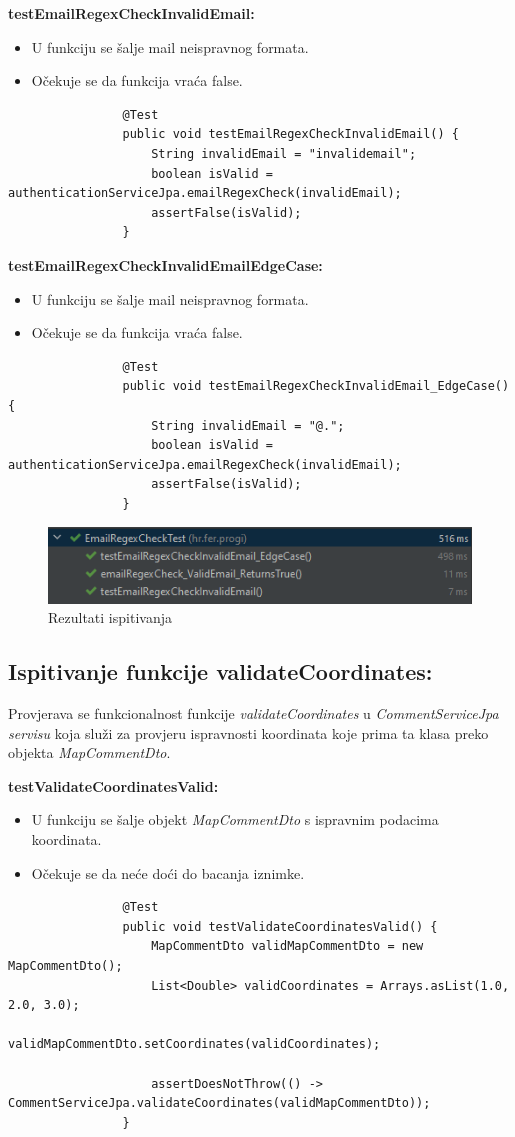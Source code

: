 			\textbf{testEmailRegexCheckInvalidEmail:}
			\begin{itemize}
				\item U funkciju se šalje mail neispravnog formata.
				\item Očekuje se da funkcija vraća false.
			\end{itemize}
			\begin{lstlisting}
				@Test
				public void testEmailRegexCheckInvalidEmail() {
					String invalidEmail = "invalidemail";
					boolean isValid = authenticationServiceJpa.emailRegexCheck(invalidEmail);
					assertFalse(isValid);
				}
			\end{lstlisting}
			
			\textbf{testEmailRegexCheckInvalidEmailEdgeCase:}
			\begin{itemize}
				\item U funkciju se šalje mail neispravnog formata.
				\item Očekuje se da funkcija vraća false.
			\end{itemize}
			\begin{lstlisting}
				@Test
				public void testEmailRegexCheckInvalidEmail_EdgeCase() {
					String invalidEmail = "@.";
					boolean isValid = authenticationServiceJpa.emailRegexCheck(invalidEmail);
					assertFalse(isValid);
				}
			\end{lstlisting}
			\begin{figure}[H]
				\includegraphics[scale=1]{slike/emailRegexTest.png} 
				\centering
				\caption{Rezultati ispitivanja}
				\label{fig:promjene}
			\end{figure}
			
			\subsection{Ispitivanje funkcije validateCoordinates:}
			Provjerava se funkcionalnost funkcije \textit{validateCoordinates} u \textit{CommentServiceJpa servisu} koja služi za provjeru ispravnosti koordinata koje prima ta klasa preko objekta \textit{MapCommentDto}.
			
			\textbf{testValidateCoordinatesValid:}
			\begin{itemize}
				\item U funkciju se šalje objekt \textit{MapCommentDto} s ispravnim podacima koordinata.
				\item Očekuje se da neće doći do bacanja iznimke.
			\end{itemize}
			\begin{lstlisting}
				@Test
				public void testValidateCoordinatesValid() {
					MapCommentDto validMapCommentDto = new MapCommentDto();
					List<Double> validCoordinates = Arrays.asList(1.0, 2.0, 3.0);
					validMapCommentDto.setCoordinates(validCoordinates);
					
					assertDoesNotThrow(() -> CommentServiceJpa.validateCoordinates(validMapCommentDto));
				}
			\end{lstlisting}
			
